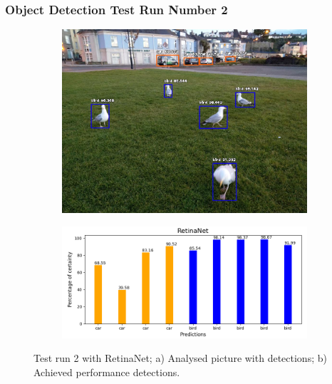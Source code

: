       \newpage

      
      \subsubsection{Object Detection Test Run Number 2}

  
    

      \begin{figure}[H]
        \centering
        \captionsetup{justification=centering}

        \begin{subfigure}{0.29\textwidth}
        \includegraphics[width=\textwidth]{Sections/4InitialWork/4_images_obj_run3/retinaNet.jpg} 
        \caption{}
        \end{subfigure}
        \begin{subfigure}{0.65\textwidth}
        \includegraphics[width=\textwidth]{Sections/4InitialWork/4_images_obj_run3/retinaNet_graph.png}
        \caption{}
        \end{subfigure}
        
        \caption{ 
        Test run 2 with RetinaNet; a) Analysed picture with detections; b) Achieved performance detections. }
        \end{figure}



